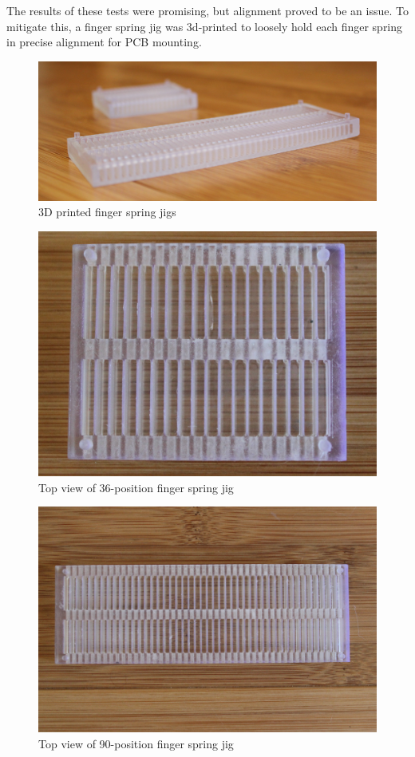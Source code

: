 \documentclass[11pt,twoside]{mitthesis}
\begin{document}
The results of these tests were promising, but alignment proved to be an issue.
To mitigate this, a finger spring jig was 3d-printed to loosely hold each finger spring in precise alignment for PCB mounting.
\begin{figure}[H]
  \begin{center}
      \includegraphics[width=.9\textwidth]{../bb-18-45.png}
      \caption{3D printed finger spring jigs}
  \end{center}
\end{figure}

\begin{figure}[H]
  \begin{center}
      \includegraphics[width=.6\textwidth]{../bb-18.png}
      \caption{Top view of 36-position finger spring jig}
  \end{center}
\end{figure}

\begin{figure}[H]
  \begin{center}
      \includegraphics[width=.9\textwidth]{../bb-45.png}
      \caption{Top view of 90-position finger spring jig}
  \end{center}
\end{figure}
\end{document}

